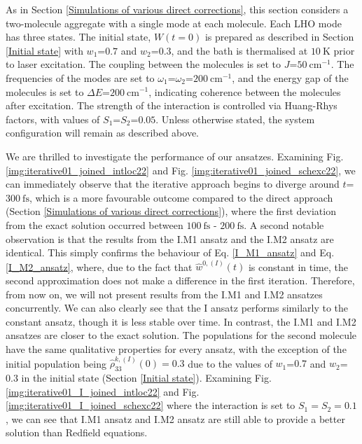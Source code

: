 As in Section \ref{Simulations of various direct corrections}, this section considers a two-molecule aggregate with a single mode at each molecule. Each LHO mode has three states. The initial state, $W(t=0)$ is prepared as described in Section \ref{Initial state} with $w_1$=$0.7$ and $w_2$=$0.3$, and the bath is thermalised at $10\:\mathrm{K}$ prior to laser excitation. The coupling between the molecules is set to $J$=$50\:\mathrm{cm}^{-1}$. The frequencies of the modes are set to $\omega_1$=$\omega_2$=$200\:\mathrm{cm}^{-1}$, and the energy gap of the molecules is set to $\Delta E$=$200\:\mathrm{cm}^{-1}$, indicating coherence between the molecules after excitation. The strength of the interaction is controlled via Huang-Rhys factors, with values of $S_1$=$S_2$=$0.05$. Unless otherwise stated, the system configuration will remain as described above. 

We are thrilled to investigate the performance of our ansatzes. Examining Fig. \ref{img:iterative01_joined_intloc22} and Fig. \ref{img:iterative01_joined_schexc22}, we can immediately observe that the iterative approach begins to diverge around $t$=$300\:\mathrm{fs}$, which is a more favourable outcome compared to the direct approach (Section \ref{Simulations of various direct corrections}), where the first deviation from the exact solution occurred between $100\:\mathrm{fs}$ - $200\:\mathrm{fs}$. A second notable observation is that the results from the I.M1 ansatz and the I.M2 ansatz are identical. This simply confirms the behaviour of Eq. \ref{I_M1_ansatz} and Eq. \ref{I_M2_ansatz}, where, due to the fact that $\hat{w}^{0,(I)}(t)$ is constant in time, the second approximation does not make a difference in the first iteration. Therefore, from now on, we will not present results from the I.M1 and I.M2 ansatzes concurrently. We can also clearly see that the I ansatz performs similarly to the constant ansatz, though it is less stable over time. In contrast, the I.M1 and I.M2 ansatzes are closer to the exact solution. The populations for the second molecule have the same qualitative properties for every ansatz, with the exception of the initial population being $\hat{\rho}^{k,(I)}_{33}(0)=0.3$ due to the values of $w_1$=$0.7$ and $w_2$=$0.3$ in the initial state (Section \ref{Initial state}). Examining Fig. \ref{img:iterative01_I_joined_intloc22} and Fig. \ref{img:iterative01_I_joined_schexc22} where the interaction is set to $S_1=S_2=0.1$, we can see that I.M1 ansatz and I.M2 ansatz are still able to provide a better solution than Redfield equations. 

